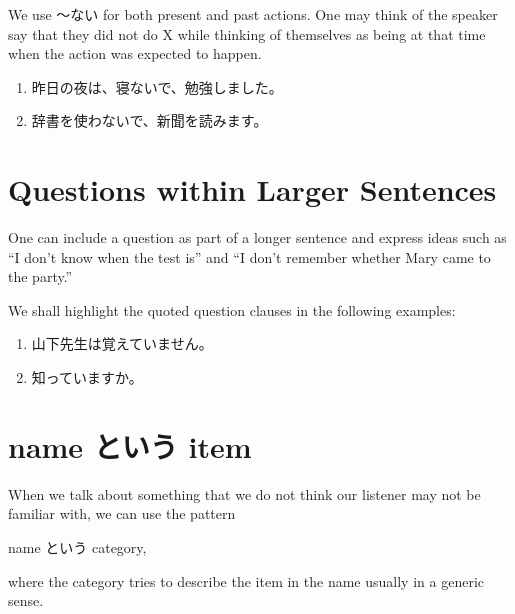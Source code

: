 \documentclass[notoc,notitlepage]{tufte-book}
\begin{document}
\begin{note}
  We use 〜ない for both present and past actions.
  One may think of the speaker say that they did not do X
  while thinking of themselves as being at that time when
  the action was expected to happen.
\end{note}

\begin{eg}
  \begin{enumerate}
    \item 昨日の夜は、寝ないで、勉強しました。
    \item 辞書を使わないで、新聞を読みます。
  \end{enumerate}
\end{eg}


\section{Questions within Larger Sentences}%
\label{sec:questions_within_larger_sentences}

One can include a question as part of a longer sentence
and express ideas such as ``I don't know when the test is''
and ``I don't remember whether Mary came to the party.''

\begin{eg}
  We shall highlight the quoted question clauses in the following
  examples:
  \begin{enumerate}
    \item 山下先生は覚えていません。
    \item {}知っていますか。 
  \end{enumerate}
\end{eg}


\section{name という item}%
\label{sec:name_toiu_item}

\begin{defn}\label{defn:name_toiu_item}
  When we talk about something that we do not think our
  listener may not be familiar with, we can use the pattern
  \begin{center}
    name という category,
  \end{center}
  where the category tries to describe the item in the name
  usually in a generic sense.
\end{defn}
\end{document}
